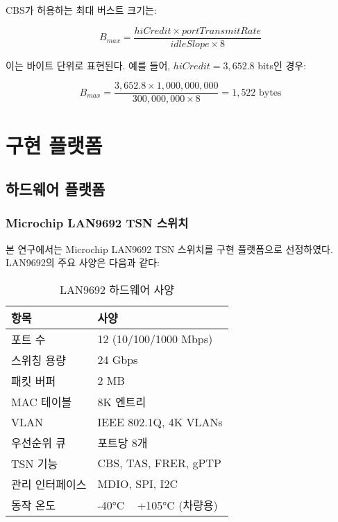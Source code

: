 \documentclass[twocolumn,10pt]{article}
\begin{document}
CBS가 허용하는 최대 버스트 크기는:

\begin{equation}
B_{max} = \frac{hiCredit \times portTransmitRate}{idleSlope \times 8}
\end{equation}

이는 바이트 단위로 표현된다. 예를 들어, $hiCredit = 3,652.8$ bits인 경우:

\begin{equation}
B_{max} = \frac{3,652.8 \times 1,000,000,000}{300,000,000 \times 8} = 1,522 \text{ bytes}
\end{equation}

\section{구현 플랫폼}
\label{sec:implementation}

\subsection{하드웨어 플랫폼}

\subsubsection{Microchip LAN9692 TSN 스위치}

본 연구에서는 Microchip LAN9692 TSN 스위치를 구현 플랫폼으로 선정하였다. LAN9692의 주요 사양은 다음과 같다:

\begin{table}[h]
\centering
\caption{LAN9692 하드웨어 사양}
\label{tab:lan9692_specs}
\begin{tabular}{ll}
\toprule
\textbf{항목} & \textbf{사양} \\
\midrule
포트 수 & 12 (10/100/1000 Mbps) \\
스위칭 용량 & 24 Gbps \\
패킷 버퍼 & 2 MB \\
MAC 테이블 & 8K 엔트리 \\
VLAN & IEEE 802.1Q, 4K VLANs \\
우선순위 큐 & 포트당 8개 \\
TSN 기능 & CBS, TAS, FRER, gPTP \\
관리 인터페이스 & MDIO, SPI, I2C \\
동작 온도 & -40°C ~ +105°C (차량용) \\
\bottomrule
\end{tabular}
\end{table}
\end{document}
